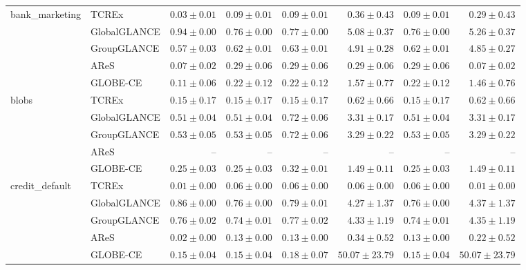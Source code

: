 \begin{table}[ht]
\begin{center}
\begin{sc}
\begin{scriptsize}
\begin{tabular}{l|l|rrrrrr}
\midrule
\multirow{5}{*}{bank\_marketing} & TCREx & $\boldsymbol{0.03\pm{0.01}}$ & $\boldsymbol{0.09\pm{0.01}}$ & $\boldsymbol{0.09\pm{0.01}}$ & $0.36\pm{0.43}$ & $\boldsymbol{0.09\pm{0.01}}$ & $0.29\pm{0.43}$ \\
 & GlobalGLANCE & $0.94\pm{0.00}$ & $0.76\pm{0.00}$ & $0.77\pm{0.00}$ & $5.08\pm{0.37}$ & $0.76\pm{0.00}$ & $5.26\pm{0.37}$ \\
 & GroupGLANCE & $0.57\pm{0.03}$ & $0.62\pm{0.01}$ & $0.63\pm{0.01}$ & $4.91\pm{0.28}$ & $0.62\pm{0.01}$ & $4.85\pm{0.27}$ \\
 & AReS & $0.07\pm{0.02}$ & $0.29\pm{0.06}$ & $0.29\pm{0.06}$ & $\boldsymbol{0.29\pm{0.06}}$ & $0.29\pm{0.06}$ & $\boldsymbol{0.07\pm{0.02}}$ \\
 & GLOBE-CE & $0.11\pm{0.06}$ & $0.22\pm{0.12}$ & $0.22\pm{0.12}$ & $1.57\pm{0.77}$ & $0.22\pm{0.12}$ & $1.46\pm{0.76}$ \\
\midrule
\multirow{5}{*}{blobs} & TCREx & $\boldsymbol{0.15\pm{0.17}}$ & $\boldsymbol{0.15\pm{0.17}}$ & $\boldsymbol{0.15\pm{0.17}}$ & $\boldsymbol{0.62\pm{0.66}}$ & $\boldsymbol{0.15\pm{0.17}}$ & $\boldsymbol{0.62\pm{0.66}}$ \\
 & GlobalGLANCE & $0.51\pm{0.04}$ & $0.51\pm{0.04}$ & $0.72\pm{0.06}$ & $3.31\pm{0.17}$ & $0.51\pm{0.04}$ & $3.31\pm{0.17}$ \\
 & GroupGLANCE & $0.53\pm{0.05}$ & $0.53\pm{0.05}$ & $0.72\pm{0.06}$ & $3.29\pm{0.22}$ & $0.53\pm{0.05}$ & $3.29\pm{0.22}$ \\
 & AReS & -- & -- & -- & -- & -- & -- \\
 & GLOBE-CE & $0.25\pm{0.03}$ & $0.25\pm{0.03}$ & $0.32\pm{0.01}$ & $1.49\pm{0.11}$ & $0.25\pm{0.03}$ & $1.49\pm{0.11}$ \\
\midrule
\multirow{5}{*}{credit\_default} & TCREx & $\boldsymbol{0.01\pm{0.00}}$ & $\boldsymbol{0.06\pm{0.00}}$ & $\boldsymbol{0.06\pm{0.00}}$ & $\boldsymbol{0.06\pm{0.00}}$ & $\boldsymbol{0.06\pm{0.00}}$ & $\boldsymbol{0.01\pm{0.00}}$ \\
 & GlobalGLANCE & $0.86\pm{0.00}$ & $0.76\pm{0.00}$ & $0.79\pm{0.01}$ & $4.27\pm{1.37}$ & $0.76\pm{0.00}$ & $4.37\pm{1.37}$ \\
 & GroupGLANCE & $0.76\pm{0.02}$ & $0.74\pm{0.01}$ & $0.77\pm{0.02}$ & $4.33\pm{1.19}$ & $0.74\pm{0.01}$ & $4.35\pm{1.19}$ \\
 & AReS & $0.02\pm{0.00}$ & $0.13\pm{0.00}$ & $0.13\pm{0.00}$ & $0.34\pm{0.52}$ & $0.13\pm{0.00}$ & $0.22\pm{0.52}$ \\
 & GLOBE-CE & $0.15\pm{0.04}$ & $0.15\pm{0.04}$ & $0.18\pm{0.07}$ & $50.07\pm{23.79}$ & $0.15\pm{0.04}$ & $50.07\pm{23.79}$ \\

\end{tabular}
\end{scriptsize}
\end{sc}
\end{center}
\end{table}
